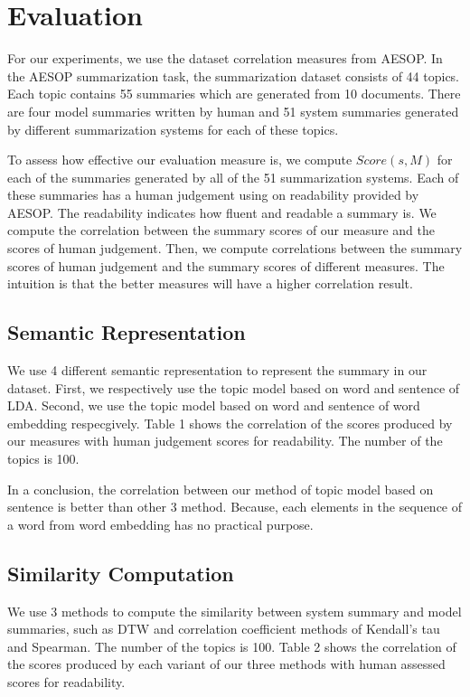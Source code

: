 \section{Evaluation}
\label{sec:eval}

For our experiments, we use the dataset correlation measures from AESOP.
In the AESOP summarization task, the summarization dataset consists of 
44 topics. Each topic contains 55 summaries which are generated from  
10 documents. There are four model summaries written by human and 51 system
summaries generated by different summarization systems for each of these topics.

To assess how effective our evaluation measure is, we compute $Score(s,M)$
for each of the summaries generated by all of the 51 summarization systems.
Each of these summaries has a human judgement using on readability provided by
AESOP. The readability indicates how fluent and readable a summary is.
We compute the correlation between the summary scores of our measure and the 
scores of human judgement. Then, we compute correlations between the summary 
scores of human judgement and the summary scores of different measures. 
The intuition is that the better measures will have a higher correlation
result.

\subsection{Semantic Representation}

We use 4 different semantic representation to represent the summary in our dataset.
First, we respectively use the topic model based on word and sentence of LDA.
Second, we use the topic model based on word and sentence of word embedding respecgively.
Table 1 shows the correlation of the scores produced by our measures with 
human judgement scores for readability. The number of the topics is 100. 


In a conclusion, the correlation between our method of topic model based on sentence 
is better than other 3 method. Because, each elements in the sequence of a word from 
word embedding has no practical purpose.

\subsection{Similarity Computation}

We use 3 methods to compute the similarity between system summary and model summaries, 
such as DTW and correlation coefficient methods of Kendall's tau and Spearman. 
The number of the topics is 100. Table 2 shows the correlation of the scores 
produced by each variant of our three methods with human assessed scores for readability.

